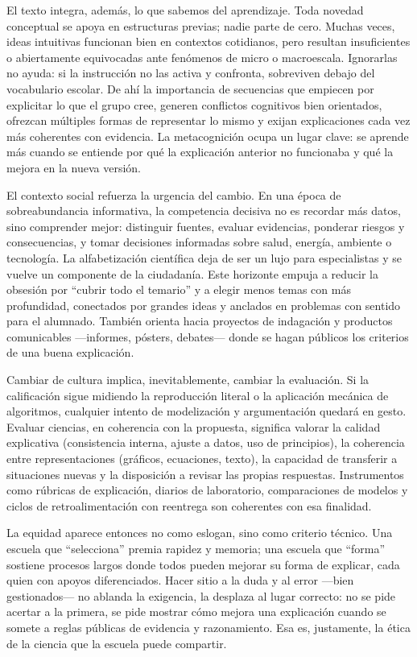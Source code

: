 \documentclass{article}
\begin{document}
\begin{tcolorbox}[enhanced,breakable,
  colback=white, colframe=black, boxrule=0.8pt,
  left=6mm,right=6mm,top=3mm,bottom=3mm,
  title={\large \textbf{Resumen narrativo}}]
El texto integra, además, lo que sabemos del aprendizaje. Toda novedad conceptual se apoya en estructuras previas; nadie parte de cero. Muchas veces, ideas intuitivas funcionan bien en contextos cotidianos, pero resultan insuficientes o abiertamente equivocadas ante fenómenos de micro o macroescala. Ignorarlas no ayuda: si la instrucción no las activa y confronta, sobreviven debajo del vocabulario escolar. De ahí la importancia de secuencias que empiecen por explicitar lo que el grupo cree, generen conflictos cognitivos bien orientados, ofrezcan múltiples formas de representar lo mismo y exijan explicaciones cada vez más coherentes con evidencia. La metacognición ocupa un lugar clave: se aprende más cuando se entiende por qué la explicación anterior no funcionaba y qué la mejora en la nueva versión.

El contexto social refuerza la urgencia del cambio. En una época de sobreabundancia informativa, la competencia decisiva no es recordar más datos, sino comprender mejor: distinguir fuentes, evaluar evidencias, ponderar riesgos y consecuencias, y tomar decisiones informadas sobre salud, energía, ambiente o tecnología. La alfabetización científica deja de ser un lujo para especialistas y se vuelve un componente de la ciudadanía. Este horizonte empuja a reducir la obsesión por “cubrir todo el temario” y a elegir menos temas con más profundidad, conectados por grandes ideas y anclados en problemas con sentido para el alumnado. También orienta hacia proyectos de indagación y productos comunicables —informes, pósters, debates— donde se hagan públicos los criterios de una buena explicación.

Cambiar de cultura implica, inevitablemente, cambiar la evaluación. Si la calificación sigue midiendo la reproducción literal o la aplicación mecánica de algoritmos, cualquier intento de modelización y argumentación quedará en gesto. Evaluar ciencias, en coherencia con la propuesta, significa valorar la calidad explicativa (consistencia interna, ajuste a datos, uso de principios), la coherencia entre representaciones (gráficos, ecuaciones, texto), la capacidad de transferir a situaciones nuevas y la disposición a revisar las propias respuestas. Instrumentos como rúbricas de explicación, diarios de laboratorio, comparaciones de modelos y ciclos de retroalimentación con reentrega son coherentes con esa finalidad.

La equidad aparece entonces no como eslogan, sino como criterio técnico. Una escuela que “selecciona” premia rapidez y memoria; una escuela que “forma” sostiene procesos largos donde todos pueden mejorar su forma de explicar, cada quien con apoyos diferenciados. Hacer sitio a la duda y al error —bien gestionados— no ablanda la exigencia, la desplaza al lugar correcto: no se pide acertar a la primera, se pide mostrar cómo mejora una explicación cuando se somete a reglas públicas de evidencia y razonamiento. Esa es, justamente, la ética de la ciencia que la escuela puede compartir.


\end{tcolorbox}
\end{document}
